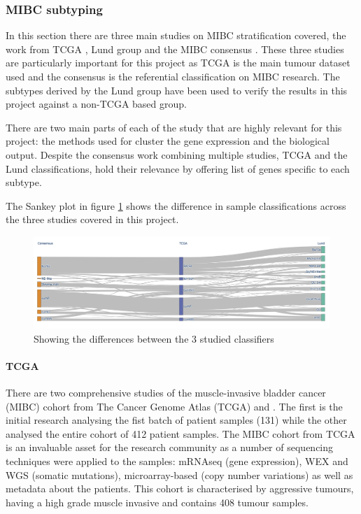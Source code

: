 \subsubsection{MIBC subtyping} \label{s:lit:subtypes_mibc}

In this section there are three main studies on MIBC stratification covered, the work from TCGA \citet{Robertson2017-mg}, Lund group \cite{Marzouka2018-ge} and the MIBC consensus \cite{Kamoun2020-tj}. These three studies are particularly important for this project as TCGA is the main tumour dataset used and the consensus is the referential classification on MIBC research. The subtypes derived by the Lund group have been used to verify the results in this project against a non-TCGA based group.

There are two main parts of each of the study that are highly relevant for this project: the methods used for cluster the gene expression and the biological output. Despite the consensus work combining multiple studies, TCGA and the Lund classifications, hold their relevance by offering list of genes specific to each subtype. 

The Sankey plot in figure \cref{fig:lit:classifier_comp} shows the difference in sample classifications across the three studies covered in this project.

\begin{figure}[!htb]   
\centering
\includegraphics[width=1.0\textwidth,height=1.0\textheight,keepaspectratio]{Sections/Lit_review/Resources/classifier_differences.png}
  \caption{Showing the differences between the 3 studied classifiers}
\label{fig:lit:classifier_comp}
\end{figure}
\FloatBarrier

\paragraph*{TCGA} \label{s:lit:tcga_mibc}

There are two comprehensive studies of the muscle-invasive bladder cancer (MIBC) cohort from The Cancer Genome Atlas (TCGA) \citet{Tcga2014-dr} and \citet{Robertson2017-mg}. The first is the initial research analysing the fist batch of patient samples (131) while the other analysed the entire cohort of 412 patient samples. The MIBC cohort from TCGA is an invaluable asset for the research community as a number of sequencing techniques were applied to the samples: mRNAseq (gene expression), WEX and WGS (somatic mutations), microarray-based (copy number variations) as well as metadata about the patients. This cohort is characterised by aggressive tumours, having a high grade muscle invasive and contains 408 tumour samples.

